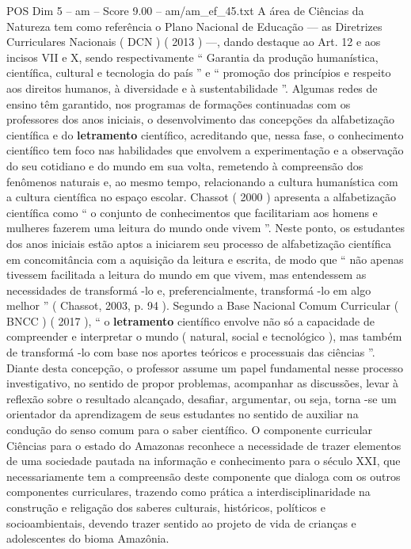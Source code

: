 \begin{textsample}{POS Dim 5 – am – Score 9.00 – am/am\_ef\_45.txt}  \label{ex:f5_pos_066}
A área de Ciências da Natureza tem como referência o Plano Nacional de Educação — as Diretrizes Curriculares Nacionais ( DCN ) ( 2013 ) —, dando destaque ao Art. 12 e aos incisos VII e X, sendo respectivamente “ Garantia da produção humanística, científica, cultural e tecnologia do país ” e “ promoção dos princípios e respeito aos direitos humanos, à diversidade e à sustentabilidade ”.
Algumas redes de ensino têm garantido, nos programas de formações continuadas com os professores dos anos iniciais, o desenvolvimento das concepções da alfabetização científica e do \textbf{letramento} científico, acreditando que, nessa fase, o conhecimento científico tem foco nas habilidades que envolvem a experimentação e a observação do seu cotidiano e do mundo em sua volta, remetendo à compreensão dos fenômenos naturais e, ao mesmo tempo, relacionando a cultura humanística com a cultura científica no espaço escolar.
Chassot ( 2000 ) apresenta a alfabetização científica como “ o conjunto de conhecimentos que facilitariam aos homens e mulheres fazerem uma leitura do mundo onde vivem ”.
Neste ponto, os estudantes dos anos iniciais estão aptos a iniciarem seu processo de alfabetização científica em concomitância com a aquisição da leitura e escrita, de modo que “ não apenas tivessem facilitada a leitura do mundo em que vivem, mas entendessem as necessidades de transformá -lo e, preferencialmente, transformá -lo em algo melhor ” ( Chassot, 2003, p. 94 ).
Segundo a Base Nacional Comum Curricular ( BNCC ) ( 2017 ), “ o \textbf{letramento} científico envolve não só a capacidade de compreender e interpretar o mundo ( natural, social e tecnológico ), mas também de transformá -lo com base nos aportes teóricos e processuais das ciências ”.
Diante desta concepção, o professor assume um papel fundamental nesse processo investigativo, no sentido de propor problemas, acompanhar as discussões, levar à reflexão sobre o resultado alcançado, desafiar, argumentar, ou seja, torna -se um orientador da aprendizagem de seus estudantes no sentido de auxiliar na condução do senso comum para o saber científico.
O componente curricular Ciências para o estado do Amazonas reconhece a necessidade de trazer elementos de uma sociedade pautada na informação e conhecimento para o século XXI, que necessariamente tem a compreensão deste componente que dialoga com os outros componentes curriculares, trazendo como prática a interdisciplinaridade na construção e religação dos saberes culturais, históricos, políticos e socioambientais, devendo trazer sentido ao projeto de vida de crianças e adolescentes do bioma Amazônia.

\end{textsample}
